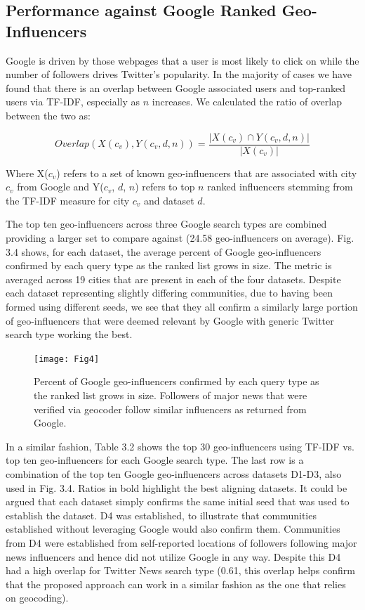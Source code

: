 \subsection{Performance against Google Ranked Geo-Influencers}

Google is driven by those webpages that a user is most likely to click on while the number of followers drives Twitter's popularity. In the majority of cases we have found that there is an overlap between Google associated users and top-ranked users via TF-IDF, especially as $n$ increases. We calculated the ratio of overlap between the two as:

\begin{equation}
Overlap(X(c_v), Y(c_v,d,n)) = \frac{|X(c_v) \cap Y(c_v,d,n)|}{|X(c_v)|}
\end{equation}

Where X($c_v$) refers to a set of known geo-influencers that are associated with city $c_v$ from Google and Y($c_v$, $d$, $n$) refers to top $n$ ranked influencers stemming from the TF-IDF measure for city $c_v$ and dataset $d$. 

The top ten geo-influencers across three Google search types are combined providing a larger set to compare against (24.58 geo-influencers on average). Fig. 3.4 shows, for each dataset, the average percent of Google geo-influencers confirmed by each query type as the ranked list grows in size. The metric is averaged across 19 cities that are present in each of the four datasets. Despite each dataset representing slightly differing communities, due to having been formed using different seeds, we see that they all confirm a similarly large portion of geo-influencers that were deemed relevant by Google with generic Twitter search type working the best.

\begin{figure}[!t]
\centering
\texttt{[image: Fig4]}
\caption[Percent of Google geo-influencers confirmed by each query type]{Percent of Google geo-influencers confirmed by each query type as the ranked list grows in size. Followers of major news that were verified via geocoder follow similar influencers as returned from Google.}
\label{fig_ch3_4}
\end{figure}

In a similar fashion, Table 3.2 shows the top 30 geo-influencers using TF-IDF vs. top ten geo-influencers for each Google search type. The last row is a combination of the top ten Google geo-influencers across datasets D1-D3, also used in Fig. 3.4. Ratios in bold highlight the best aligning datasets. It could be argued that each dataset simply confirms the same initial seed that was used to establish the dataset. D4 was established, to illustrate that communities established without leveraging Google would also confirm them. Communities from D4 were established from self-reported locations of followers following major news influencers and hence did not utilize Google in any way. Despite this D4 had a high overlap for Twitter News search type (0.61, this overlap helps confirm that the proposed approach can work in a similar fashion as the one that relies on geocoding).

